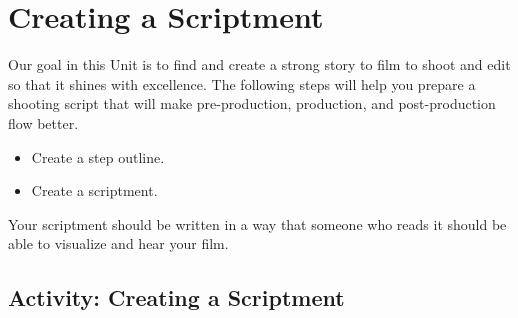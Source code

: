 \documentclass[
  letterpaper,
  DIV=11,
  numbers=noendperiod]{scrreprt}
\providecommand{\tightlist}{%
  \setlength{\itemsep}{0pt}\setlength{\parskip}{0pt}}\usepackage{longtable,booktabs,array}
\begin{document}
\section{Creating a Scriptment}\label{creating-a-scriptment}

Our goal in this Unit is to find and create a strong story to film to
shoot and edit so that it shines with excellence. The following steps
will help you prepare a shooting script that will make pre-production,
production, and post-production flow better.

\begin{itemize}
\tightlist
\item
  Create a step outline.
\item
  Create a scriptment.
\end{itemize}

Your scriptment should be written in a way that someone who reads it
should be able to visualize and hear your film.

\subsection{Activity: Creating a
Scriptment}\label{activity-creating-a-scriptment}
\end{document}
